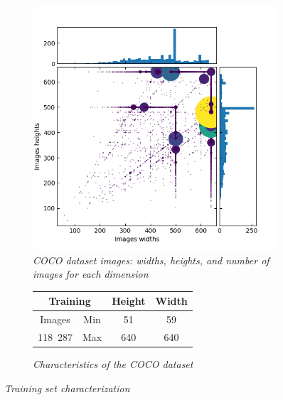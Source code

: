 \documentclass{article}
\begin{document}
            \begin{figure}[!ht]
                \begin{subfigure}{.49\linewidth}
                    \centering
                    \includegraphics[width=\linewidth]{pics/train2017full.png}
                    \caption{\textit{COCO dataset images: widths, heights, and number of images for each dimension}}
                \end{subfigure}
                \begin{subfigure}{.49\linewidth}
                    \center
                    \begin{tabular}{|c||c|c|c|}
                        \hline
                        \multicolumn{2}{|c|}{Training} & Height & Width \\
                        \hline
                        \hline
                        Images & Min & 51 & 59 \\
                        \hline
                        118~287 & Max & 640 & 640 \\
                        \hline
                    \end{tabular}
                    \caption{\textit{Characteristics of the COCO dataset}}
                \end{subfigure}
                \caption{\textit{Training set characterization}}
                \label{fig:train}
            \end{figure}
\end{document}
